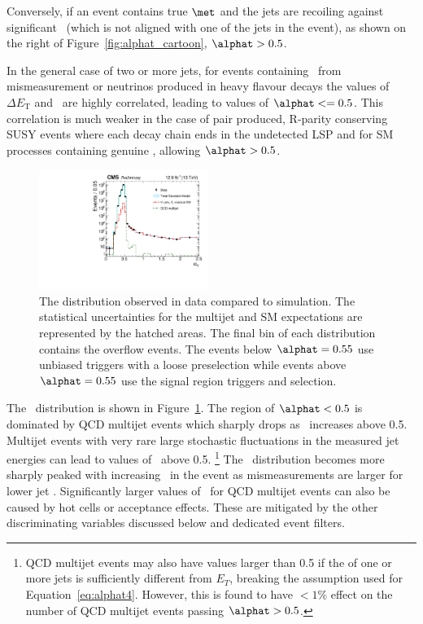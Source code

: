 Conversely, if an event contains true $\met$ and the jets are recoiling against significant~\met 
(which is not aligned with one of the jets in the event), as shown on the right of 
Figure~\ref{fig:alphat_cartoon}, $\alphat > 0.5$. 

In the general case of two or more jets, for events containing \met~from mismeasurement or 
neutrinos produced in heavy flavour decays the values of $\Delta E_{\textrm{T}}$ and \mht~are highly correlated, leading
to values of $\alphat <= 0.5$. This correlation is much weaker in the case of pair produced, 
R-parity conserving SUSY events where each decay chain ends in the 
undetected LSP and for SM processes containing genuine \met, allowing $\alphat > 0.5$.

\begin{figure}[!htb]
  \centering
    \includegraphics[width=0.49\textwidth]{./Figures/alphat/alphat_data.pdf}
  \caption{
    The \alphat distribution observed in data compared to simulation. 
    The statistical uncertainties for the multijet and SM
    expectations are represented by the hatched areas. 
    The final bin of each distribution contains the overflow events. The events below $\alphat= 0.55$ use unbiased triggers with
    a loose preselection while events above $\alphat = 0.55$ use the signal region triggers and selection.
    }
  \label{fig:alphat-data}
\end{figure}

The \alphat~distribution is shown in Figure~\ref{fig:alphat-data}. The region of $\alphat < 0.5$ is dominated by
QCD multijet events which sharply drops as \alphat~increases above 0.5. Multijet events with
very rare large stochastic fluctuations in the measured jet energies can lead
to values of \alphat~above 0.5. \footnote{QCD multijet events may also have \alphat values larger than 0.5 if the 
\pt of one or more jets is sufficiently different from $E_T$, breaking the assumption used for Equation~\ref{eq:alphat4}. 
However, this is found to have $< 1\%$ effect on the number of QCD multijet events passing $\alphat > 0.5$.}
The \alphat~distribution becomes more sharply peaked with increasing \scalht~in the event as mismeasurements are larger
 for lower jet \pt. Significantly larger values of \alphat~for QCD multijet events can also be caused by 
hot cells or acceptance effects. These are mitigated by the other discriminating variables 
discussed below and dedicated event filters. 

